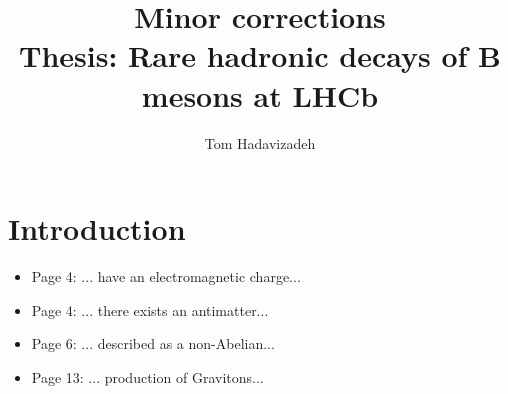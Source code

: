 \documentclass[12pt]{article}
\title{Minor corrections\\
Thesis: Rare hadronic decays of B mesons at LHCb}
\author{Tom Hadavizadeh}
\begin{document}
\maketitle

\section{Introduction}
\begin{itemize}
\item Page 4: ... have {\color{red}an} electromagnetic charge...
\item Page 4: ... there exists {\color{red}an} antimatter...
\item Page 6: ... described {\color{red}as} a non-Abelian...
\item Page 13: ... production {\color{red}of} Gravitons...
\end{itemize}
\end{document}
